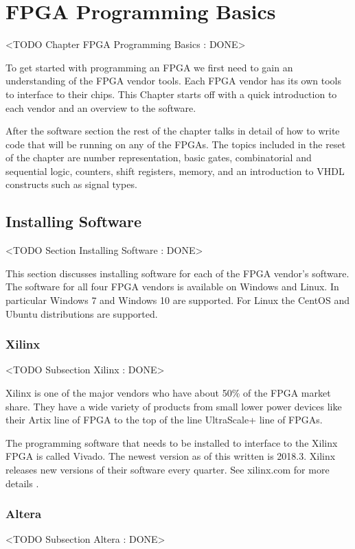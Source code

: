 \chapter{FPGA Programming Basics}
	<TODO Chapter FPGA Programming Basics : DONE>

To get started with programming an \ac{FPGA} we first need to gain an understanding of the \ac{FPGA} vendor tools. Each \ac{FPGA} vendor has its own tools to interface to their chips. This Chapter starts off with a quick introduction to each vendor and an overview to the software. 

After the software section the rest of the chapter talks in detail of how to write code that will be running on any of the \ac{FPGA}s. The topics included in the reset of the chapter are number representation, basic gates, combinatorial and sequential logic, counters, shift registers, memory, and an introduction to \ac{VHDL} constructs such as signal types. 
	
\section{Installing Software}
	<TODO Section Installing Software : DONE>

This section discusses installing software for each of the \ac{FPGA} vendor's software. The software for all four \ac{FPGA} vendors is available on Windows and Linux. In particular Windows 7 and Windows 10 are supported. For Linux the CentOS and Ubuntu distributions are supported. 
	
\subsection{Xilinx}
	<TODO Subsection Xilinx : DONE>

Xilinx is one of the major vendors who have about 50\% of the \ac{FPGA} market share. They have a wide variety of products from small lower power devices like their Artix line of \ac{FPGA} to the top of the line UltraScale+ line of \ac{FPGA}s.

The programming software that needs to be installed to interface to the Xilinx \ac{FPGA} is called Vivado. The newest version as of this written is 2018.3. Xilinx releases new versions of their software every quarter. See xilinx.com for more details \cite{xilref}. 	
	
\subsection{Altera}
	<TODO Subsection Altera : DONE>


